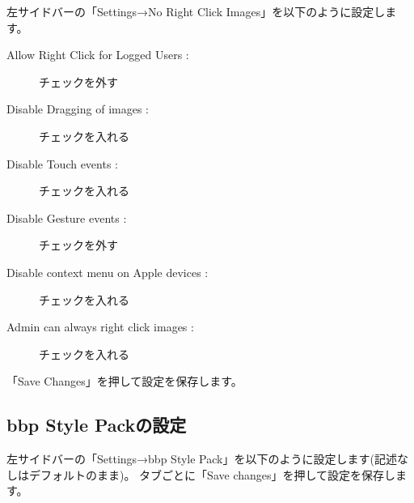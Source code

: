 \documentclass[titlepage,10pt,a4paper,uplatex]{jsbook}
\begin{document}
左サイドバーの「Settings→No Right Click Images」を以下のように設定します。

\begin{description}
\item[Allow Right Click for Logged Users : ] チェックを外す
\item[Disable Dragging of images : ] チェックを入れる
\item[Disable Touch events : ] チェックを入れる
\item[Disable Gesture events : ] チェックを外す
\item[Disable context menu on Apple devices : ] チェックを入れる
\item[Admin can always right click images : ] チェックを入れる
\end{description}

「Save Changes」を押して設定を保存します。

\subsection{bbp Style Packの設定}

左サイドバーの「Settings→bbp Style Pack」を以下のように設定します(記述なしはデフォルトのまま)。
タブごとに「Save changes」を押して設定を保存します。
\end{document}
